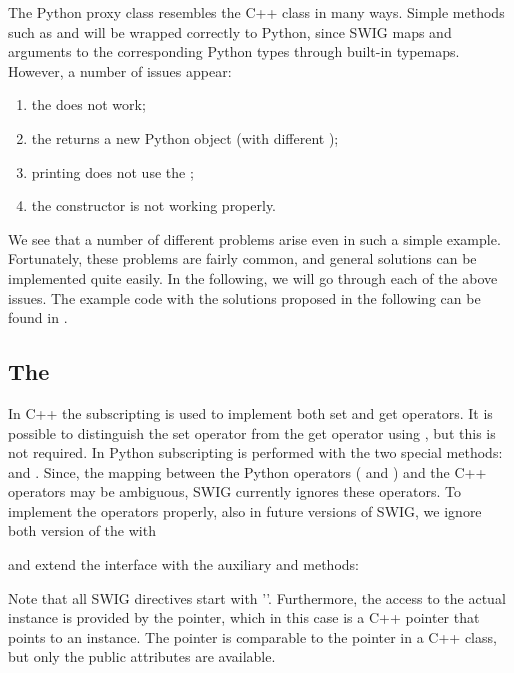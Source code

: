 The Python proxy class resembles the C++ class in many ways. Simple methods
such as  and  will be wrapped correctly to
Python, since SWIG maps  and  arguments to the
corresponding Python types through built-in typemaps.  
However, a number of issues appear:
\begin{enumerate}
\item the  does not work;
\item the  returns a new Python object (with different );
\item printing does not use the ;%
\item the  constructor is not working properly.%
\end{enumerate}
We see that a number of different problems arise even in such a simple
example. Fortunately, these problems are fairly common, and general
solutions can be implemented quite easily. In the following, we will go through 
each of the above issues. The example code with the solutions proposed in
the following can be found in . 

\subsection{The }
In C++ the subscripting  is used to implement both set and get
operators. It is possible to distinguish the set operator from the get
operator using , but this is not required.  
In Python subscripting is performed with the two special methods:  and . 
Since, the mapping between the Python operators 
( and ) and the C++ operators  
may be ambiguous, SWIG currently ignores these operators. 
To implement the operators properly, also in future versions of SWIG, we ignore both version of the  with
\begin{c++}
\end{c++}
and extend the interface with the auxiliary 
 and  methods: 
Note that all SWIG directives start with '\emp{\%}'.
Furthermore, the access to the actual instance is provided by the
 pointer, which in this case is a C++ pointer that points to an
 instance. The pointer is comparable to the  pointer
in a C++ class, but only the public attributes are available. 

